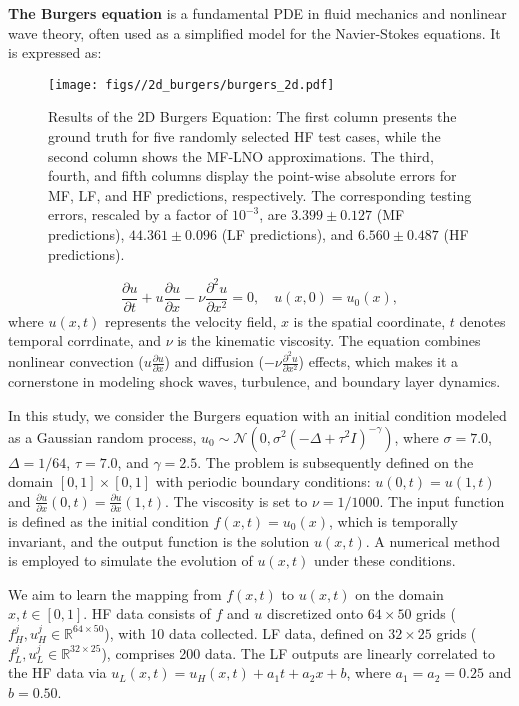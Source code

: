 \textbf{The Burgers equation} is a fundamental PDE in fluid mechanics and nonlinear wave theory, often used as a simplified model for the Navier-Stokes equations. It is expressed as:

\begin{figure}[!htbp]
    \centering
    \texttt{[image: figs//2d\_burgers/burgers\_2d.pdf]}
    \caption{Results of the 2D Burgers Equation: The first column presents the ground truth for five randomly selected HF test cases, while the second column shows the MF-LNO approximations. The third, fourth, and fifth columns display the point-wise absolute errors for MF, LF, and HF predictions, respectively. The corresponding testing errors, rescaled by a factor of $10^{-3}$, are ${3.399} \pm {0.127}$ (MF predictions), $44.361 \pm 0.096$ (LF predictions), and $6.560 \pm 0.487$ (HF predictions).}
    \label{fig:burgers}
\end{figure}

\begin{equation}\label{eq:burgers}
    \frac{\partial u}{\partial t} + u\frac{\partial u}{\partial x} - \nu \frac{\partial^2 u}{\partial x^2} = 0, \quad u(x, 0) = u_0(x),
\end{equation}
where $u(x, t)$ represents the velocity field, $x$ is the spatial coordinate, $t$ denotes temporal corrdinate, and $\nu$ is the kinematic viscosity. The equation combines nonlinear convection ($u\frac{\partial u}{\partial x}$) and diffusion ($-\nu\frac{\partial^2 u}{\partial x^2}$) effects, which makes it a cornerstone in modeling shock waves, turbulence, and boundary layer dynamics. 

In this study, we consider the Burgers equation with an initial condition modeled as a Gaussian random process, $ u_0 \sim \mathcal{N}\left(0, \sigma^2(-\Delta + \tau^2 I)^{-\gamma}\right) $, where $ \sigma = 7.0 $, $ \Delta = 1/64 $, $ \tau = 7.0 $, and $ \gamma = 2.5 $. The problem is subsequently defined on the domain $ [0, 1] \times [0, 1] $ with periodic boundary conditions: $ u(0, t) = u(1, t) $ and $ \frac{\partial u}{\partial x}(0, t) = \frac{\partial u}{\partial x}(1, t) $. The viscosity is set to $ \nu = 1/1000 $. The input function is defined as the initial condition $ f(x, t) = u_0(x) $, which is temporally invariant, and the output function is the solution $ u(x, t) $. A numerical method is employed to simulate the evolution of $ u(x, t) $ under these conditions.

We aim to learn the mapping from $ f(x, t) $ to $ u(x, t) $ on the domain $ x, t \in [0, 1] $. HF data consists of $ f $ and $ u $ discretized onto $ 64 \times 50 $ grids ($ f_H^j, u_H^j \in \mathbb{R}^{64 \times 50} $), with 10 data collected. LF data, defined on $ 32 \times 25 $ grids ($ f_L^j, u_L^j \in \mathbb{R}^{32 \times 25} $), comprises 200 data. The LF outputs are linearly correlated to the HF data via $ u_L(x, t) = u_H(x, t) + a_1 t + a_2 x + b $, where $ a_1 = a_2 = 0.25 $ and $ b = 0.50 $.

